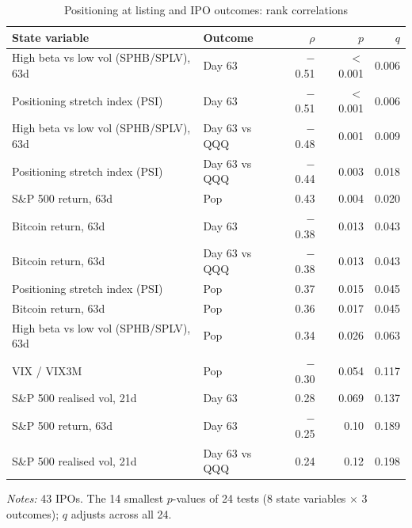 \begin{table}[!htbp]\centering\footnotesize
\caption{Positioning at listing and IPO outcomes: rank correlations}\label{tab:ipocorr}

\begin{threeparttable}
\begin{tabular}{llrrr}
\toprule
State variable & Outcome & $\rho$ & $p$ & $q$ \\
\midrule
High beta vs low vol (SPHB/SPLV), 63d & Day 63 & $-$0.51 & $<$0.001 & 0.006 \\
Positioning stretch index (PSI) & Day 63 & $-$0.51 & $<$0.001 & 0.006 \\
High beta vs low vol (SPHB/SPLV), 63d & Day 63 vs QQQ & $-$0.48 & 0.001 & 0.009 \\
Positioning stretch index (PSI) & Day 63 vs QQQ & $-$0.44 & 0.003 & 0.018 \\
S\&P 500 return, 63d & Pop & 0.43 & 0.004 & 0.020 \\
Bitcoin return, 63d & Day 63 & $-$0.38 & 0.013 & 0.043 \\
Bitcoin return, 63d & Day 63 vs QQQ & $-$0.38 & 0.013 & 0.043 \\
Positioning stretch index (PSI) & Pop & 0.37 & 0.015 & 0.045 \\
Bitcoin return, 63d & Pop & 0.36 & 0.017 & 0.045 \\
High beta vs low vol (SPHB/SPLV), 63d & Pop & 0.34 & 0.026 & 0.063 \\
VIX / VIX3M & Pop & $-$0.30 & 0.054 & 0.117 \\
S\&P 500 realised vol, 21d & Day 63 & 0.28 & 0.069 & 0.137 \\
S\&P 500 return, 63d & Day 63 & $-$0.25 & 0.10 & 0.189 \\
S\&P 500 realised vol, 21d & Day 63 vs QQQ & 0.24 & 0.12 & 0.198 \\
\bottomrule
\end{tabular}
\begin{tablenotes}[flushleft]\footnotesize
\item \textit{Notes:} 43 IPOs. The 14 smallest $p$-values of 24 tests (8 state variables $\times$ 3 outcomes); $q$ adjusts across all 24.
\end{tablenotes}
\end{threeparttable}

\end{table}
